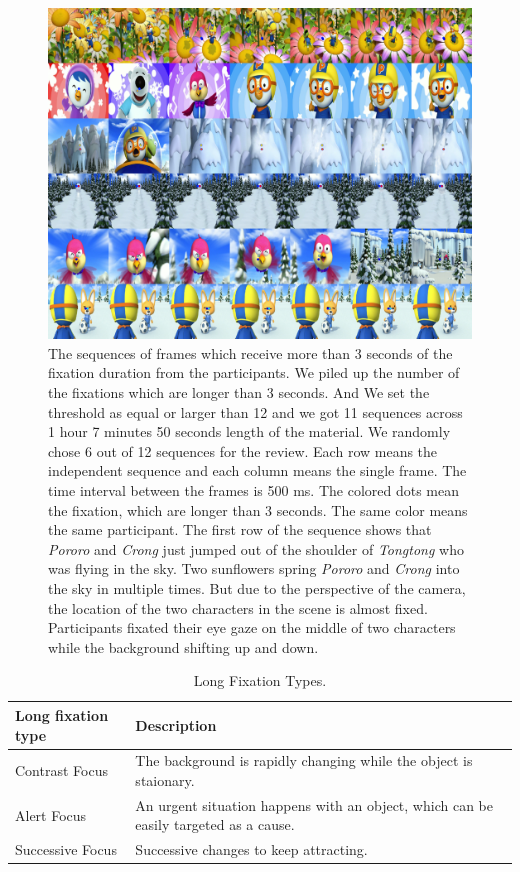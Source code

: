 \documentclass[10pt,letterpaper]{article}
\begin{document}
\begin{figure}
  \centerline{\includegraphics[width=178mm]{./eps/long_fixations.png}}
  \caption{The sequences of frames which receive more than 3 seconds of the fixation duration from the participants. We piled up the number of the fixations which are longer than 3 seconds. And We set the threshold as equal or larger than 12 and we got 11 sequences across 1 hour 7 minutes 50 seconds length of the material. We randomly chose 6 out of 12 sequences for the review. Each row means the independent sequence and each column means the single frame. The time interval between the frames is 500 ms. The colored dots mean the fixation, which are longer than 3 seconds. The same color means the same participant. The first row of the sequence shows that \textit{Pororo} and \textit{Crong} just jumped out of the shoulder of \textit{Tongtong} who was flying in the sky. Two sunflowers spring \textit{Pororo} and \textit{Crong} into the sky in multiple times. But due to the perspective of the camera, the location of the two characters in the scene is almost fixed. Participants fixated their eye gaze on the middle of two characters while the background shifting up and down.}
  \label{fig:long-fixations}
\end{figure}

\begin{table}[!ht]
\begin{center} 
\caption{Long Fixation Types.} 
\label{long-fixation-types} 
\vskip 0.12in
\begin{tabular}{ll} 
\hline
Long fixation type    &  Description \\
\hline
Contrast Focus        &   The background is rapidly changing while the object 
                          is staionary. \\
Alert Focus           &   An urgent situation happens with an object, which can 
                          be easily targeted as a cause. \\
Successive Focus      &   Successive changes to keep attracting. \\
\hline
\end{tabular} 
\end{center} 
\end{table}
\end{document}
